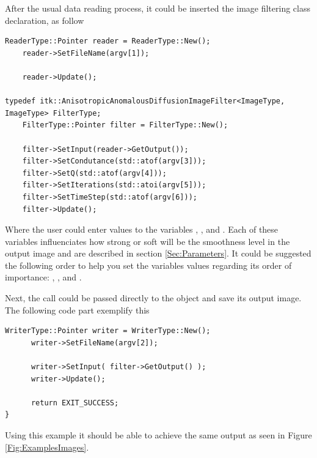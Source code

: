 \documentclass{InsightArticle}
\begin{document}
After the usual data reading process, it could be inserted the image filtering class declaration, as follow 

\small
\begin{verbatim}
ReaderType::Pointer reader = ReaderType::New();
    reader->SetFileName(argv[1]);
    
    reader->Update();
        
typedef itk::AnisotropicAnomalousDiffusionImageFilter<ImageType, ImageType> FilterType;
    FilterType::Pointer filter = FilterType::New();

    filter->SetInput(reader->GetOutput());
    filter->SetCondutance(std::atof(argv[3]));
    filter->SetQ(std::atof(argv[4]));
    filter->SetIterations(std::atoi(argv[5]));
    filter->SetTimeStep(std::atof(argv[6]));
    filter->Update();
\end{verbatim}
\normalsize

Where the user could enter values to the variables , ,  and . Each of these variables influenciates how strong or soft will be the smoothness level in the output image and are described in section \ref{Sec:Parameters}. It could be suggested the following order to help you set the variables values regarding its order of importance: , ,  and .

Next, the  call could be passed directly to the  object and save its output image. The following code part exemplify this

\small
\begin{verbatim}
WriterType::Pointer writer = WriterType::New();
      writer->SetFileName(argv[2]);
      
      writer->SetInput( filter->GetOutput() );
      writer->Update();
      
      return EXIT_SUCCESS;
}
\end{verbatim}
\normalsize

Using this example it should be able to achieve the same output as seen in Figure \ref{Fig:ExamplesImages}.
\end{document}
